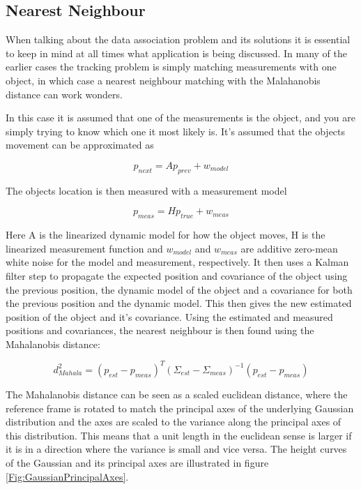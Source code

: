 \subsection{Nearest Neighbour}

When talking about the data association problem and its solutions it is essential to keep in mind at all times what application is being discussed. In many of the earlier cases the tracking problem is simply matching measurements with one object, in which case a nearest neighbour matching with the Malahanobis distance can work wonders\cite{ShalomTracking}. 

In this case it is assumed that one of the measurements is the object, and you are simply trying to know which one it most likely is. It's assumed that the objects movement can be approximated as

\begin{equation}
    p_{next} = Ap_{prev} + w_{model}
\end{equation}

The objects location is then measured with a measurement model

\begin{equation}
    p_{meas} = Hp_{true} + w_{meas}
\end{equation}
 
Here A is the linearized dynamic model for how the object moves, H is the linearized measurement function and $w_{model}$ and $w_{meas}$ are additive zero-mean white noise for the model and measurement, respectively. It then uses a Kalman filter step to propagate the expected position and covariance of the object using the previous position, the dynamic model of the object and a covariance for both the previous position and the dynamic model. This then gives the new estimated position of the object and it's covariance. Using the estimated and measured positions and covariances, the nearest neighbour is then found using the Mahalanobis distance\cite{MahalanobisTracking}:

\begin{equation}
    d^2_{Mahala} = (p_{est} - p_{meas})^T(\Sigma_{est} - \Sigma_{meas})^{-1}(p_{est} - p_{meas})
\end{equation}

The Mahalanobis distance can be seen as a scaled euclidean distance, where the reference frame is rotated to match the principal axes of the underlying Gaussian distribution and the axes are scaled to the variance along the principal axes of this distribution. This means that a unit length in the euclidean sense is larger if it is in a direction where the variance is small and vice versa. The height curves of the Gaussian and its principal axes are illustrated in figure \ref{Fig:GaussianPrincipalAxes}. 

